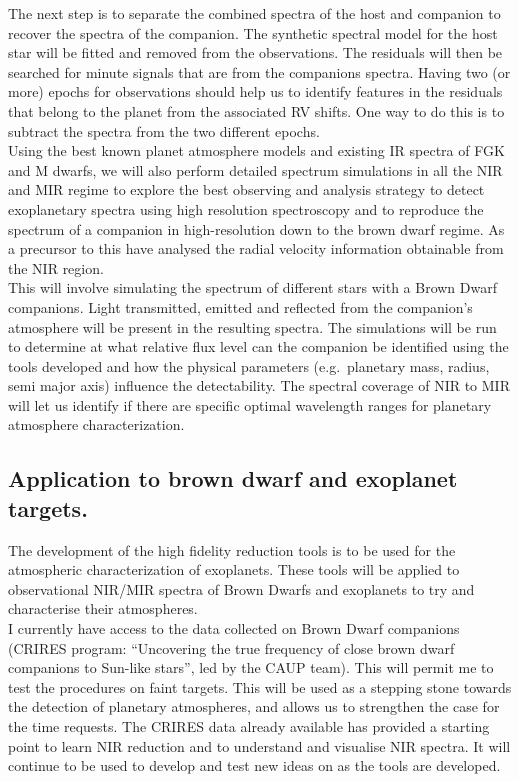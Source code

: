 \documentclass[pdftex,12pt,a4paper]{article}
\begin{document}
The next step is to separate the combined spectra of the host and companion to recover the spectra of the companion. The synthetic spectral model for the host star will be fitted and removed from the observations. The residuals will then be searched for minute signals that are from the companions spectra. Having two (or more) epochs for observations should help us to identify features in the residuals that belong to the planet from the associated {RV} shifts. One way to do this is to subtract the spectra from the two different epochs. \\

Using the best known planet atmosphere models and existing IR spectra of FGK and M dwarfs, we will also perform detailed spectrum simulations in all the NIR and MIR regime to explore the best observing and analysis strategy to detect exoplanetary spectra using high resolution spectroscopy and to reproduce the spectrum of a companion in high-resolution down to the brown dwarf regime. As a precursor to this \citet{Figueria2015prep} have analysed the radial velocity information obtainable from the NIR region.\\

This will involve simulating the spectrum of different stars with a Brown Dwarf companions. Light transmitted, emitted and reflected from the companion's atmosphere will be present in the resulting spectra. The simulations will be run to determine at what relative flux level can the companion be identified using the tools developed and how the physical parameters (e.g.\ planetary mass, radius,  semi major axis) influence the detectability. The spectral coverage of NIR to MIR will let us identify if there are specific optimal wavelength ranges for planetary atmosphere characterization.

\subsection{Application to brown dwarf and exoplanet targets.}

The development of the high fidelity reduction tools is to be used for the atmospheric characterization of exoplanets. These tools will be applied to observational NIR/MIR spectra of Brown Dwarfs and exoplanets to try and characterise their atmospheres. \\

I currently have access to the data collected on Brown Dwarf companions (CRIRES program: ``Uncovering the true frequency of close brown dwarf companions to Sun-like stars'', led by the CAUP team). This will permit me to test the procedures on faint targets. This will be used as a stepping stone towards the detection of planetary atmospheres, and allows us to strengthen the case for the time requests. The CRIRES data already available has provided a starting point to learn NIR reduction and to understand and visualise NIR spectra. It will continue to be used to develop and test new ideas on as the tools are developed.\\
\end{document}
